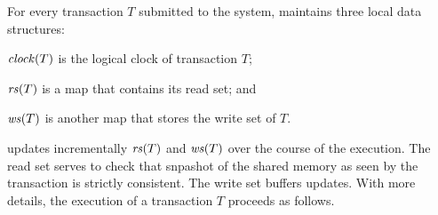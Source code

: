 For every transaction $T$ submitted to the system,  maintains three local data structures:
\begin{inparaenumorig}[]
\item $\clockOf{T}$ is the logical clock of transaction $T$;
\item $\readSetOf{T}$ is a map that contains its read set; and 
\item $\writeSetOf{T}$ is another map that stores the write set of $T$.
\end{inparaenumorig}
 updates incrementally $\readSetOf{T}$ and $\writeSetOf{T}$ over the course of the execution.
The read set serves to check that snpashot of the shared memory as seen by the transaction is strictly consistent.
The write set buffers updates.
With more details, the execution of a transaction $T$ proceeds as follows.

